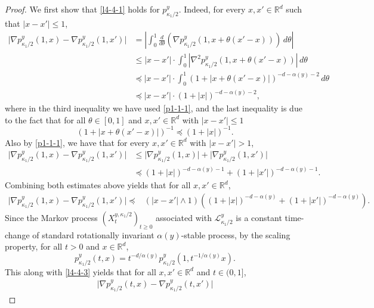 \documentclass[a4paper,11pt]{amsart}
\renewcommand{\le}{\leqslant}
\renewcommand{\ge}{\geqslant}
\newcommand{\R}{\mathds R}
\newcommand{\p}{\preceq}
\newcommand{\K}{\kappa}
\newcommand{\A}{\alpha}
\def\LL{{\mathcal L}}
\theoremstyle{definition}
\begin{document}
\begin{proof}
We first show that \eqref{l4-4-1} holds for $p^y_{{\K_1}/{2}}$. Indeed, for every $x,x'\in \R^d$ such that $|x-x'|\le 1$,
\begin{align*}
\big|\nabla p^y_{{\K_1}/{2}}(1,x)-\nabla p^y_{{\K_1}/{2}}(1,x')\big|&=
\left|\int_0^1 \frac{d}{d \theta}\left(\nabla p^y_{{\K_1}/{2}}
\left(1,x+\theta(x'-x)\right)\right)\,d\theta\right|\\
&\le |x-x'|\cdot\int_0^1 \left|\nabla^2 p^y_{{\K_1}/{2}}
\left(1,x+\theta(x'-x)\right)\right|\,d\theta\\
&\p |x-x'|\cdot \int_0^1 \left(1+\left|x+\theta(x'-x)\right|\right)^{-d-\A(y)-2}\,d\theta\\
&\p |x-x'|\cdot \left(1+|x|\right)^{-d-\A(y)-2},
\end{align*}
where in the third inequality we have used \eqref{p1-1-1}, and the last inequality is due to
the fact that for all $\theta\in [0,1]$ and $x,x'\in \R^d$ with $|x-x'|\le 1$
\begin{equation*}
\left(1+\left|x+\theta(x'-x)\right|\right)^{-1}\p \left(1+|x|\right)^{-1}.
\end{equation*}
Also by \eqref{p1-1-1}, we have that for every
$x,x'\in \R^d$ with $|x-x'|>1$,
\begin{align*}
\big|\nabla p^y_{{\K_1}/{2}}(1,x)-\nabla p^y_{{\K_1}/{2}}(1,x')\big|&
\le \big|\nabla p^y_{{\K_1}/{2}}(1,x)\big|+
\big|\nabla p^y_{{\K_1}/{2}}(1,x')\big|\\
&\p (1+|x|)^{-d-\A(y)-1}+
(1+|x'|)^{-d-\A(y)-1}.
\end{align*}
Combining both estimates above yields that for all $x,x'\in \R^d$,
\begin{equation}\label{l4-4-3}
\begin{split}
\big|\nabla p^y_{{\K_1}/{2}}(1,x)-\nabla p^y_{{\K_1}/{2}}(1,x')\big|
\p &\left(|x-x'|\wedge 1\right)\left(
(1+|x|)^{-d-\A(y)}+
(1+|x'|)^{-d-\A(y)}\right).
\end{split}
\end{equation}
Since the Markov process $(X_t^{y,{\K_1}/{2}})_{t\ge0}$ associated with
$ \LL^y_{{\K_1}/{2}}$ is a constant time-change of standard rotationally invariant $\A(y)$-stable process, by
the scaling property, for all $t>0$ and $x \in \R^d$,
$$
 p^y_{{\K_1}/{2}}(t,x)= t^{-d/\A(y)} p^y_{{\K_1}/{2}}(1,t^{-1/\A(y)}x).
$$
This along with \eqref{l4-4-3} yields that for all $x,x'\in \R^d$ and $t\in (0,1]$,
\begin{equation}\label{l4-4-4}
\begin{split}
\big|\nabla p^y_{{\K_1}/{2}}(t,x)-\nabla p^y_{{\K_1}/{2}}(t,x')\big|

\end{split}
\end{equation}
\end{proof}
\end{document}
